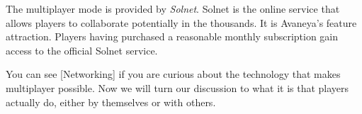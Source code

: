 

The multiplayer mode is provided by {\it Solnet}. Solnet is the online service that allows players to collaborate potentially in the thousands. It is Avaneya's feature attraction. Players having purchased a reasonable monthly subscription gain access to the official Solnet service.

You can see [Networking] if you are curious about the technology that makes multiplayer possible. Now we will turn our discussion to what it is that players actually do, either by themselves or with others.

